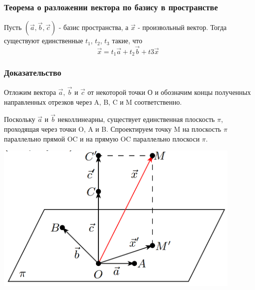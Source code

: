 \documentclass[a4paper]{article}
\begin{document}
{\begin{small}
\subsubsection*{Теорема о разложении вектора по базису в пространстве}

Пусть $( \vec{a}, \vec{b}, \vec{c})$ - базис пространства, а $\vec{x}$ - произвольный вектор. Тогда существуют единственные $t_1$, $t_2$, $t_3$ такие, что
\begin{equation}
\vec{x} = t_1 \vec{a} + t_2 \vec{b} + t3 \vec{x}
\end{equation}

\subsubsection*{Доказательство}

Отложим вектора $\vec{a}$, $\vec{b}$  и $\vec{c}$ от некоторой точки О и обозначим концы полученных направленных отрезков через A, B, C и M соответственно.

Поскольку $\vec{a}$ и $\vec{b}$ неколлинеарны, существует единственная плоскость $\pi$, проходящая через точки O, A и B. Спроектируем точку M на плоскость $\pi$ параллельно прямой OC и  на прямую OC параллельно плоскоси $\pi$. 

\includegraphics[width=12cm]{t3}


\end{small}}
\end{document}
